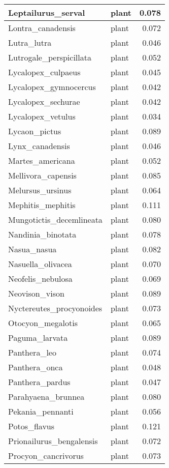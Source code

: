 \begin{table}
\begin{tabular}[t]{l|l|r}
\hline
Leptailurus\_serval & plant & 0.078\\
\hline
Lontra\_canadensis & plant & 0.072\\
\hline
Lutra\_lutra & plant & 0.046\\
\hline
Lutrogale\_perspicillata & plant & 0.052\\
\hline
Lycalopex\_culpaeus & plant & 0.045\\
\hline
Lycalopex\_gymnocercus & plant & 0.042\\
\hline
Lycalopex\_sechurae & plant & 0.042\\
\hline
Lycalopex\_vetulus & plant & 0.034\\
\hline
Lycaon\_pictus & plant & 0.089\\
\hline
Lynx\_canadensis & plant & 0.046\\
\hline
Martes\_americana & plant & 0.052\\
\hline
Mellivora\_capensis & plant & 0.085\\
\hline
Melursus\_ursinus & plant & 0.064\\
\hline
Mephitis\_mephitis & plant & 0.111\\
\hline
Mungotictis\_decemlineata & plant & 0.080\\
\hline
Nandinia\_binotata & plant & 0.078\\
\hline
Nasua\_nasua & plant & 0.082\\
\hline
Nasuella\_olivacea & plant & 0.070\\
\hline
Neofelis\_nebulosa & plant & 0.069\\
\hline
Neovison\_vison & plant & 0.089\\
\hline
Nyctereutes\_procyonoides & plant & 0.073\\
\hline
Otocyon\_megalotis & plant & 0.065\\
\hline
Paguma\_larvata & plant & 0.089\\
\hline
Panthera\_leo & plant & 0.074\\
\hline
Panthera\_onca & plant & 0.048\\
\hline
Panthera\_pardus & plant & 0.047\\
\hline
Parahyaena\_brunnea & plant & 0.080\\
\hline
Pekania\_pennanti & plant & 0.056\\
\hline
Potos\_flavus & plant & 0.121\\
\hline
Prionailurus\_bengalensis & plant & 0.072\\
\hline
Procyon\_cancrivorus & plant & 0.073\\
\hline

\end{tabular}
\end{table}

